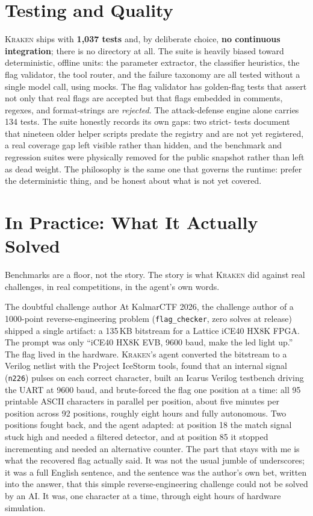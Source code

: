 \documentclass[10pt,twocolumn]{article}
\newcommand{\kraken}{\textsc{Kraken}}
\newcommand{\code}[1]{\seqsplit{\texttt{#1}}}
\begin{document}
\section{Testing and Quality}
\label{sec:tests}

\kraken{} ships with \textbf{1{,}037 tests} and, by deliberate choice, \textbf{no continuous integration};
there is no \code{.github} directory at all. The suite is heavily biased toward deterministic, offline units:
the parameter extractor, the classifier heuristics, the flag validator, the tool router, and the failure
taxonomy are all tested without a single model call, using mocks. The flag validator has golden-flag tests
that assert not only that real flags are accepted but that flags embedded in comments, regexes, and
format-strings are \emph{rejected}. The attack-defense engine alone carries 134 tests. The suite honestly
records its own gaps: two strict-\code{xfail} tests document that nineteen older helper scripts predate the
\code{tool\_meta.json} registry and are not yet registered, a real coverage gap left visible rather than
hidden, and the benchmark and regression suites were physically removed for the public snapshot rather than
left as dead weight. The philosophy is the same one that governs the runtime: prefer the deterministic thing,
and be honest about what is not yet covered.

\section{In Practice: What It Actually Solved}
\label{sec:practice}

Benchmarks are a floor, not the story. The story is what \kraken{} did against real challenges, in real
competitions, in the agent's own words.

\begin{finding}{The doubtful challenge author}
At KalmarCTF 2026, the challenge author of a 1000-point reverse-engineering problem (\texttt{flag\_checker},
zero solves at release) shipped a single artifact: a 135\,KB bitstream for a Lattice iCE40 HX8K FPGA. The
prompt was only ``iCE40 HX8K EVB, 9600 baud, make the led light up.'' The flag lived in the hardware.
\kraken{}'s agent converted the bitstream to a Verilog netlist with the Project IceStorm tools, found that an
internal signal (\texttt{n226}) pulses on each correct character, built an Icarus Verilog testbench driving the
UART at 9600 baud, and brute-forced the flag one position at a time: all 95 printable ASCII characters in
parallel per position, about five minutes per position across 92 positions, roughly eight hours and fully
autonomous. Two positions fought back, and the agent adapted: at position 18 the match signal stuck high and
needed a filtered detector, and at position 85 it stopped incrementing and needed an alternative counter. The
part that stays with me is what the recovered flag actually said. It was not the usual jumble of
underscores; it was a full English sentence, and the sentence was the author's own bet, written into the
answer, that this simple reverse-engineering challenge could not be solved by an AI. It was, one character at
a time, through eight hours of hardware simulation.
\end{finding}
\end{document}
